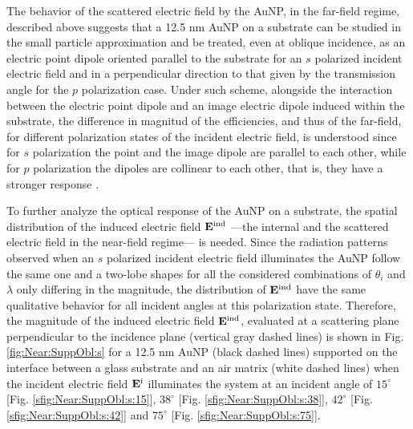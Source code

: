 The behavior of the scattered electric field by the AuNP, in the far-field regime, described above suggests that a 12.5 nm AuNP on a substrate can be studied in the small particle approximation and be treated, even at oblique incidence, as an electric point dipole oriented  parallel to the substrate for an $s$ polarized incident electric field and in a perpendicular direction to that given by the transmission angle for the $p$ polarization case. Under such scheme, alongside the interaction between the electric point dipole and an image electric dipole induced within the substrate, the difference in magnitud of the efficiencies, and thus of the far-field, for different polarization states of the incident electric field,  is understood since for $s$ polarization the point and the image dipole are parallel to each other, while for  $p$ polarization the dipoles are collinear to each other, that is, they have a stronger response \cite{griffiths2013electrodynamics}.

To further analyze the optical response of the AuNP on a substrate, the spatial distribution of the induced electric field $\vb{E}^\text{ind}$ ---the internal and the scattered electric field in the near-field regime--- is needed. Since the radiation patterns observed when an $s$ polarized incident electric field illuminates the AuNP follow the same one and a two-lobe shapes for all the considered combinations of $\theta_i$ and $\lambda$ only differing in the magnitude, the distribution of $\vb{E}^\text{ind}$  have the same qualitative behavior for all incident angles at this polarization state. Therefore, the magnitude of the induced electric field $\vb{E}^\text{ind}$, evaluated at a scattering plane perpendicular to the incidence plane (vertical gray dashed lines) is shown in Fig. \ref{fig:Near:SuppObl:s} for a 12.5 nm AuNP (black dashed lines) supported on the interface between a glass substrate and an air matrix (white dashed lines) when the incident electric field $\vb{E}^\text{i}$ illuminates the system at an incident angle of $15^\circ$ [Fig. \ref{sfig:Near:SuppObl:s:15}], $38^\circ$ [Fig. \ref{sfig:Near:SuppObl:s:38}], $42^\circ$ [Fig. \ref{sfig:Near:SuppObl:s:42}]  and $75^\circ$ [Fig. \ref{sfig:Near:SuppObl:s:75}].

